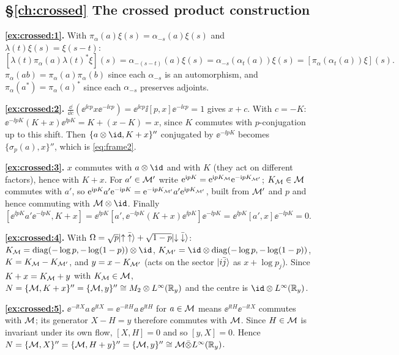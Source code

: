 {\subsection*{\S\ref{ch:crossed} The crossed product construction}
\textbf{\ref{ex:crossed:1}.} With $\pi_\alpha(a)\xi(s)=\alpha_{-s}(a)\xi(s)$ and $\lambda(t)\xi(s)=\xi(s-t)$:\[[\lambda(t)\pi_\alpha(a)\lambda(t)^*\xi](s)=\alpha_{-(s-t)}(a)\xi(s)=\alpha_{-s}(\alpha_t(a))\xi(s)=[\pi_\alpha(\alpha_t(a))\xi](s).\]$\pi_\alpha(ab)=\pi_\alpha(a)\pi_\alpha(b)$ since each $\alpha_{-s}$ is an automorphism, and $\pi_\alpha(a^*)=\pi_\alpha(a)^*$ since each $\alpha_{-s}$ preserves adjoints.\par
\textbf{\ref{ex:crossed:2}.} $\frac{\dd}{\dd c}(\ee^{\ii cp}x\ee^{-\ii cp})=\ee^{\ii cp}\ii[p,x]\ee^{-\ii cp}=1$ gives $x+c$. With $c=-K$: $\ee^{-\ii pK}(K+x)\ee^{\ii pK}=K+(x-K)=x$, since $K$ commutes with $p$-conjugation up to this shift. Then $\{a\otimes\id,K+x\}''$ conjugated by $\ee^{-\ii pK}$ becomes $\{\sigma_p(a),x\}''$, which is \eqref{eq:frame2}.\par
\textbf{\ref{ex:crossed:3}.} $x$ commutes with $a\otimes\id$ and with $K$ (they act on different factors), hence with $K+x$. For $a'\in\mathcal{M}'$ write $\mathrm{e}^{\mathrm{i} pK}=\mathrm{e}^{\mathrm{i} pK_{\mathcal{M}}}\mathrm{e}^{-\mathrm{i} pK_{\mathcal{M}'}}$; $K_{\mathcal{M}}\in\mathcal{M}$ commutes with $a'$, so $\mathrm{e}^{\mathrm{i} pK}a'\mathrm{e}^{-\mathrm{i} pK}=\mathrm{e}^{-\mathrm{i} pK_{\mathcal{M}'}}a'\mathrm{e}^{\mathrm{i} pK_{\mathcal{M}'}}$, built from $\mathcal{M}'$ and $p$ and hence commuting with $\M\otimes\id$. Finally $[\ee^{\ii pK}a'\ee^{-\ii pK},K+x]=\ee^{\ii pK}[a',\ee^{-\ii pK}(K+x)\ee^{\ii pK}]\ee^{-\ii pK}=\ee^{\ii pK}[a',x]\ee^{-\ii pK}=0$.\par
\textbf{\ref{ex:crossed:4}.} With $\Omega=\sqrt p\lvert \uparrow\bar\uparrow\rangle+\sqrt{1-p}\lvert \downarrow\bar\downarrow\rangle$: $K_\M=\mathrm{diag}(-\log p,-\log(1-p))\otimes\id$, $K_{\M'}=\id\otimes\mathrm{diag}(-\log p,-\log(1-p))$, $K=K_{\mathcal{M}}-K_{\mathcal{M}'}$, and $y=x-K_{\mathcal{M}'}$ (acts on the sector $\lvert i\bar j\rangle$ as $x+\log p_j$). Since $K+x=K_{\mathcal{M}}+y$ with $K_{\mathcal{M}}\in\mathcal{M}$, $N=\{\mathcal{M},K+x\}''=\{\mathcal{M},y\}''\cong M_2\otimes L^\infty(\mathbb{R}_y)$ and the centre is $\id\otimes\Linf(\R_y)$.\par
\textbf{\ref{ex:crossed:5}.} $\ee^{-\ii tX}a\,\ee^{\ii tX}=\ee^{-\ii tH}a\,\ee^{\ii tH}$ for $a\in\mathcal{M}$ means $\ee^{\ii tH}\ee^{-\ii tX}$ commutes with $\mathcal{M}$; its generator $X-H=y$ therefore commutes with $\mathcal{M}$. Since $H\in\mathcal{M}$ is invariant under its own flow, $[X,H]=0$ and so $[y,X]=0$. Hence $N=\{\mathcal{M},X\}''=\{\mathcal{M},H+y\}''=\{\mathcal{M},y\}''\cong\mathcal{M}\bar\otimes L^\infty(\mathbb{R}_y)$.\par

}
